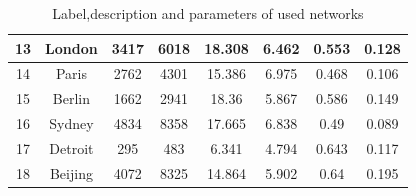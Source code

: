 \documentclass[12pt]{article}
\begin{document}
\begin{table}[ht]
{\begin{tabular}{|c|c|c|c|c|c|c|c|c|}
            13&\multicolumn{2}{c|}{London}&3417&6018&18.308&6.462&0.553&0.128\\ 
            \hline
            14&\multicolumn{2}{c|}{Paris}&2762&4301&15.386&6.975&0.468&0.106\\ 
            \hline
            15&\multicolumn{2}{c|}{Berlin}&1662&2941&18.36&5.867&0.586&0.149\\ 
            \hline
            16&\multicolumn{2}{c|}{Sydney}&4834&8358&17.665&6.838&0.49&0.089\\ 
            \hline
            17&\multicolumn{2}{c|}{Detroit}&295&483&6.341&4.794&0.643&0.117\\ 
            \hline
            18&\multicolumn{2}{c|}{Beijing}&4072&8325&14.864&5.902&0.64&0.195\\ 
            \hline
        \end{tabular}
    }
    \caption{Label,description and parameters of used networks} 
    \label{tb:descriptions}
\end{table}
\end{document}

